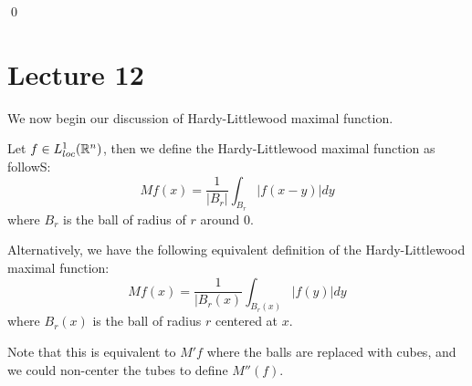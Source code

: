 \qed



\section{Lecture 12}
We now begin our discussion of Hardy-Littlewood maximal function.


\begin{definition}
    Let $f\in L_{loc}^1(\mathbb{R}^n)$, then we define the Hardy-Littlewood maximal function as followS:
    \begin{equation*}
        Mf(x)=\frac{1}{|B_r|}\int_{B_r}|f(x-y)|dy
    \end{equation*}
    where $B_r$ is the ball of radius of $r$ around 0. 

    Alternatively, we have the following equivalent definition of the Hardy-Littlewood maximal function:
    \begin{equation*}
        Mf(x)=\frac{1}{|B_r(x)}\int_{B_r(x)}|f(y)|dy
    \end{equation*}
    where $B_r(x)$ is the ball of radius $r$ centered at $x$.
\end{definition}
Note that this is equivalent to $M'f$ where the balls are replaced with cubes, and we could non-center the tubes to define $M''(f)$.

